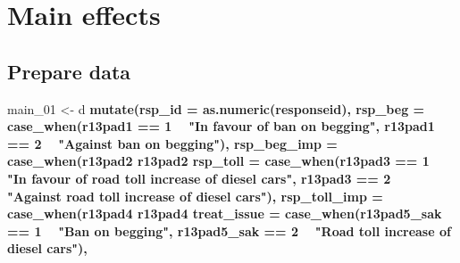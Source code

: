 \documentclass[]{book}
\newenvironment{Shaded}{\begin{snugshade}}{\end{snugshade}}
\newcommand{\KeywordTok}[1]{\textcolor[rgb]{0.13,0.29,0.53}{\textbf{#1}}}
\newcommand{\DataTypeTok}[1]{\textcolor[rgb]{0.13,0.29,0.53}{#1}}
\newcommand{\DecValTok}[1]{\textcolor[rgb]{0.00,0.00,0.81}{#1}}
\newcommand{\StringTok}[1]{\textcolor[rgb]{0.31,0.60,0.02}{#1}}
\newcommand{\OperatorTok}[1]{\textcolor[rgb]{0.81,0.36,0.00}{\textbf{#1}}}
\newcommand{\NormalTok}[1]{#1}
\begin{document}
\section{Main effects}\label{main-effects-3}

\subsection{Prepare data}\label{prepare-data-8}

\begin{Shaded}
\begin{Highlighting}[]
\NormalTok{main_}\DecValTok{01}\NormalTok{ <-}\StringTok{ }\NormalTok{d }\OperatorTok{%>%}\StringTok{ }
\StringTok{  }\KeywordTok{mutate}\NormalTok{(}\DataTypeTok{rsp_id =} \KeywordTok{as.numeric}\NormalTok{(responseid),}
         \DataTypeTok{rsp_beg =} \KeywordTok{case_when}\NormalTok{(r13pad1 }\OperatorTok{==}\StringTok{ }\DecValTok{1} \OperatorTok{~}\StringTok{ "In favour of ban on begging"}\NormalTok{,}
\NormalTok{                             r13pad1 }\OperatorTok{==}\StringTok{ }\DecValTok{2} \OperatorTok{~}\StringTok{ "Against ban on begging"}\NormalTok{),}
         \DataTypeTok{rsp_beg_imp =} \KeywordTok{case_when}\NormalTok{(r13pad2 }\OperatorTok{%in%}\StringTok{ }\DecValTok{1}\OperatorTok{:}\DecValTok{2} \OperatorTok{~}\StringTok{ "Important"}\NormalTok{,}
\NormalTok{                                  r13pad2 }\OperatorTok{%in%}\StringTok{ }\DecValTok{3}\OperatorTok{:}\DecValTok{5} \OperatorTok{~}\StringTok{ "Not important"}\NormalTok{),}
         \DataTypeTok{rsp_toll =} \KeywordTok{case_when}\NormalTok{(r13pad3 }\OperatorTok{==}\StringTok{ }\DecValTok{1} \OperatorTok{~}\StringTok{ "In favour of road toll increase of diesel cars"}\NormalTok{,}
\NormalTok{                              r13pad3 }\OperatorTok{==}\StringTok{ }\DecValTok{2} \OperatorTok{~}\StringTok{ "Against road toll increase of diesel cars"}\NormalTok{),}
         \DataTypeTok{rsp_toll_imp =} \KeywordTok{case_when}\NormalTok{(r13pad4 }\OperatorTok{%in%}\StringTok{ }\DecValTok{1}\OperatorTok{:}\DecValTok{2} \OperatorTok{~}\StringTok{ "Important"}\NormalTok{,}
\NormalTok{                                  r13pad4 }\OperatorTok{%in%}\StringTok{ }\DecValTok{3}\OperatorTok{:}\DecValTok{5} \OperatorTok{~}\StringTok{ "Not important"}\NormalTok{),}
         \DataTypeTok{treat_issue =} \KeywordTok{case_when}\NormalTok{(r13pad5_sak }\OperatorTok{==}\StringTok{ }\DecValTok{1} \OperatorTok{~}\StringTok{ "Ban on begging"}\NormalTok{,}
\NormalTok{                               r13pad5_sak }\OperatorTok{==}\StringTok{ }\DecValTok{2} \OperatorTok{~}\StringTok{ "Road toll increase of diesel cars"}\NormalTok{),}
}}}}}
\end{Highlighting}
\end{Shaded}
\end{document}
